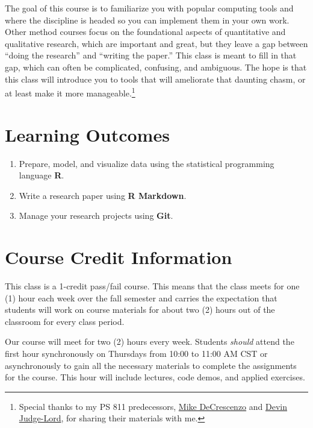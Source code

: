\documentclass[11pt,]{article}
\begin{document}
The goal of this course is to familiarize you with popular computing
tools and where the discipline is headed so you can implement them in
your own work. Other method courses focus on the foundational aspects of
quantitative and qualitative research, which are important and great,
but they leave a gap between ``doing the research'' and ``writing the
paper.'' This class is meant to fill in that gap, which can often be
complicated, confusing, and ambiguous. The hope is that this class will
introduce you to tools that will ameliorate that daunting chasm, or at
least make it more manageable.\footnote{Special thanks to my PS 811
  predecessors, \href{https://mikedecr.github.io/}{Mike DeCrescenzo} and
  \href{https://judgelord.github.io}{Devin Judge-Lord}, for sharing
  their materials with me.}

\hypertarget{learning-outcomes}{%
\section{Learning Outcomes}\label{learning-outcomes}}

\begin{enumerate}
\def\labelenumi{\arabic{enumi}.}
\item
  Prepare, model, and visualize data using the statistical programming
  language \textbf{R}.
\item
  Write a research paper using \textbf{R Markdown}.
\item
  Manage your research projects using \textbf{Git}.
\end{enumerate}

\hypertarget{course-credit-information}{%
\section{Course Credit Information}\label{course-credit-information}}

This class is a 1-credit pass/fail course. This means that the class
meets for one (1) hour each week over the fall semester and carries the
expectation that students will work on course materials for about two
(2) hours out of the classroom for every class period.

Our course will meet for two (2) hours every week. Students
\emph{should} attend the first hour synchronously on Thursdays from
10:00 to 11:00 AM CST or asynchronously to gain all the necessary
materials to complete the assignments for the course. This hour will
include lectures, code demos, and applied exercises.
\end{document}
